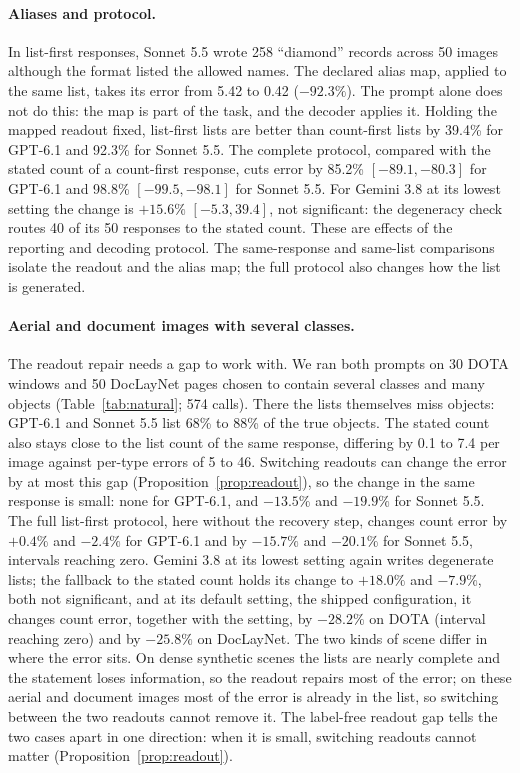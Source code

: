 \paragraph{Aliases and protocol.} In list-first responses, Sonnet 5.5 wrote 258 ``diamond'' records across 50 images although the format listed the allowed names. The declared alias map, applied to the same list, takes its error from 5.42 to 0.42 ($-92.3\%$). The prompt alone does not do this: the map is part of the task, and the decoder applies it. Holding the mapped readout fixed, list-first lists are better than count-first lists by 39.4\% for GPT-6.1 and 92.3\% for Sonnet 5.5. The complete protocol, compared with the stated count of a count-first response, cuts error by 85.2\% $[-89.1,-80.3]$ for GPT-6.1 and 98.8\% $[-99.5,-98.1]$ for Sonnet 5.5. For Gemini 3.8 at its lowest setting the change is $+15.6\%$ $[-5.3,39.4]$, not significant: the degeneracy check routes 40 of its 50 responses to the stated count. These are effects of the reporting and decoding protocol. The same-response and same-list comparisons isolate the readout and the alias map; the full protocol also changes how the list is generated.

\paragraph{Aerial and document images with several classes.} The readout repair needs a gap to work with. We ran both prompts on 30 DOTA windows and 50 DocLayNet pages chosen to contain several classes and many objects (Table~\ref{tab:natural}; 574 calls). There the lists themselves miss objects: GPT-6.1 and Sonnet 5.5 list 68\% to 88\% of the true objects. The stated count also stays close to the list count of the same response, differing by 0.1 to 7.4 per image against per-type errors of 5 to 46. Switching readouts can change the error by at most this gap (Proposition~\ref{prop:readout}), so the change in the same response is small: none for GPT-6.1, and $-13.5\%$ and $-19.9\%$ for Sonnet 5.5. The full list-first protocol, here without the recovery step, changes count error by $+0.4\%$ and $-2.4\%$ for GPT-6.1 and by $-15.7\%$ and $-20.1\%$ for Sonnet 5.5, intervals reaching zero. Gemini 3.8 at its lowest setting again writes degenerate lists; the fallback to the stated count holds its change to $+18.0\%$ and $-7.9\%$, both not significant, and at its default setting, the shipped configuration, it changes count error, together with the setting, by $-28.2\%$ on DOTA (interval reaching zero) and by $-25.8\%$ on DocLayNet. The two kinds of scene differ in where the error sits. On dense synthetic scenes the lists are nearly complete and the statement loses information, so the readout repairs most of the error; on these aerial and document images most of the error is already in the list, so switching between the two readouts cannot remove it. The label-free readout gap tells the two cases apart in one direction: when it is small, switching readouts cannot matter (Proposition~\ref{prop:readout}).

